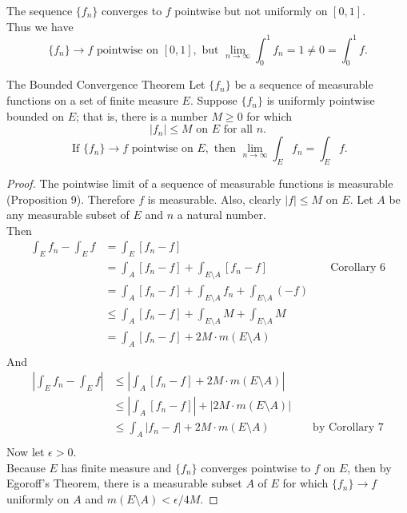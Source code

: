 \begin{flushleft}
        The sequence $\{f_n\}$ converges to $f$ pointwise but not uniformly on $[0,1]$.
        \\Thus we have
        \[
            \{f_n\}\to f\text{ pointwise on }[0,1],\text{ but }\lim_{n\to\infty}\int_0^1f_n=1\neq0=\int_0^1f.
        \]
    \begin{namedthm*}{The Bounded Convergence Theorem}
        Let $\{f_n\}$ be a sequence of measurable functions on a set of finite measure $E$.
        Suppose $\{f_n\}$ is uniformly pointwise bounded on $E$; that is, there is a number $M\ge0$ for which
        \[
            |f_n|\le M\text{ on }E\text{ for all }n.
        \]
        \[
            \text{ If }\{f_n\}\to f\text{ pointwise on }E,\text{ then }\lim_{n\to\infty}\int_Ef_n=\int_Ef.   
        \]
    \end{namedthm*}
    \begin{proof}
        The pointwise limit of a sequence of measurable functions is measurable (Proposition 9).
        Therefore $f$ is measurable.
        Also, clearly $|f|\le M$ on $E$.
        Let $A$ be any measurable subset of $E$ and $n$ a natural number.
        \\Then
        \begin{align*}
            \int_Ef_n-\int_Ef&=\int_E[f_n-f]\\
            &=\int_A[f_n-f]+\int_{E\setminus A}[f_n-f]&&\text{ Corollary 6}\\
            &=\int_A[f_n-f]+\int_{E\setminus A}f_n+\int_{E\setminus A}(-f)\\
            &\le\int_A[f_n-f]+\int_{E\setminus A}M+\int_{E\setminus A}M\\
            &=\int_A[f_n-f]+2M\cdot m(E\setminus A)\\
        \end{align*} 
        And
        \begin{align*}
            |\int_Ef_n-\int_Ef|&\le|\int_A[f_n-f]+2M\cdot m(E\setminus A)|\\
            &\le|\int_A[f_n-f]|+|2M\cdot m(E\setminus A)|\\
            &\le\int_A|f_n-f|+2M\cdot m(E\setminus A)&&\text{ by Corollary 7}\\
        \end{align*}
        Now let $\epsilon>0$.
        \\Because $E$ has finite measure and $\{f_n\}$ converges pointwise to $f$ on $E$, then by Egoroff's Theorem, there is a measurable subset $A$ of $E$ for which $\{f_n\}\to f$ uniformly on $A$ and $m(E\setminus A)<\epsilon/4M$.

\end{proof}
\end{flushleft}
